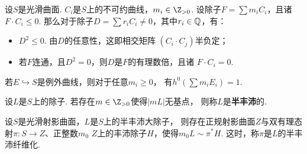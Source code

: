 \begin{lemma}
    设$S$是光滑曲面. $C_{i}$是$S$上的不可约曲线，$m_{i} \in \Z_{> 0}$.
    设除子$F = \sum m_{i}C_{i}$，且诸$F \cdot C_{i} \leq 0$.
    那么对于除子$D = \sum r_{i}C_{i} \neq 0$，其中$r_{i} \in \mathbb{Q}$，有：
    \begin{itemize}
        \item[(1)] $D^{2} \leq 0$. 由$D$的任意性，这即相交矩阵
        $(C_{i} \cdot C_{j})$半负定；
        \item[(2)] 若$F$连通，且$D^{2} = 0$，则$D$是$F$的有理数倍，且诸
        $F \cdot C_{i} = 0$.
    \end{itemize}
\end{lemma}

\begin{proposition}
    若$E \hookrightarrow S$是例外曲线，则对于任意$m_{i} \geq 0$，
    有$h^{0}(\sum m_{i}E_{i}) = 1$.
\end{proposition}

\begin{definition}
    设$L$是$S$上的除子. 若存在$m \in \Z_{> 0}$使得$|mL|$无基点，
    则称$L$是\textbf{半丰沛}的.
\end{definition}

\begin{theorem}
    设$S$是光滑射影曲面，$L$是$S$上的半丰沛大除子，
    则存在正规射影曲面$Z$与双有理态射$\pi \colon S \to Z$、正整数$m_{0}$
    $Z$上的丰沛除子$H$，使得$m_{0}L \sim \pi^{*}H$.
    这时，称$\pi$是$L$的半丰沛纤维化.
\end{theorem}